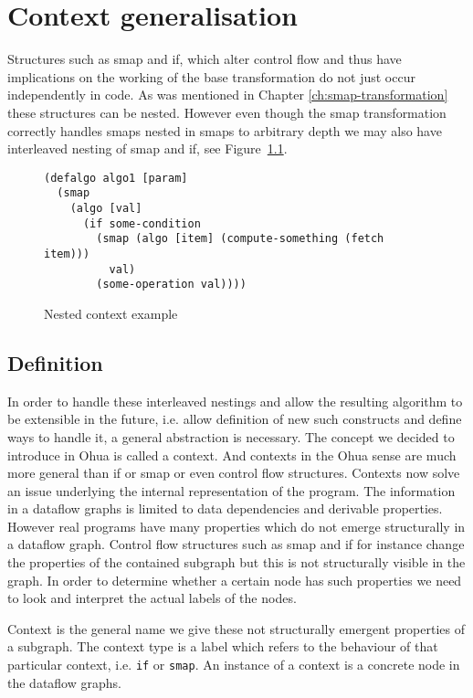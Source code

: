\chapter{Context generalisation}

\label{ch:Context}

Structures such as smap and if, which alter control flow and thus have implications on the working of the \yauhau{} base transformation do not just occur independently in code.
As was mentioned in Chapter \ref{ch:smap-transformation} these structures can be nested.
However even though the smap transformation correctly handles smaps nested in smaps to arbitrary depth we may also have interleaved nesting of smap and if, see Figure~\ref{fig:nested-context-example}.

\begin{figure}
\begin{verbatim}
(defalgo algo1 [param]
  (smap
    (algo [val]
      (if some-condition
        (smap (algo [item] (compute-something (fetch item)))
          val)
        (some-operation val))))
\end{verbatim}
\caption{Nested context example}
\label{fig:nested-context-example}
\end{figure}

\section{Definition}

In order to handle these interleaved nestings and allow the resulting algorithm to be extensible in the future, i.e. allow definition of new such constructs and define ways to handle it, a general abstraction is necessary.
The concept we decided to introduce in Ohua is called a context.
And contexts in the Ohua sense are much more general than if or smap or even control flow structures.
Contexts now solve an issue underlying the internal representation of the program.
The information in a dataflow graphs is limited to data dependencies and derivable properties.
However real programs have many properties which do not emerge structurally in a dataflow graph.
Control flow structures such as smap and if for instance change the properties of the contained subgraph but this is not structurally visible in the graph.
In order to determine whether a certain node has such properties we need to look and interpret the actual labels of the nodes.

Context is the general name we give these not structurally emergent properties of a subgraph.
The context type is a label which refers to the behaviour of that particular context, i.e. \texttt{if} or \texttt{smap}.
An instance of a context is a concrete node in the dataflow graphs.

